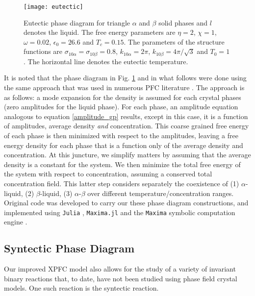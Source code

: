 \begin{figure}[h]
    \centering	
    \texttt{[image: eutectic]}
    \caption[Eutectic Phase Diagram]{
        \label{eutectic} Eutectic phase diagram for triangle $\alpha$ and
        $\beta$ solid phases and $l$ denotes the liquid. The free energy
        parameters are $\eta = 2$, $\chi = 1$, $\omega=0.02$, $\epsilon_0 =
        26.6$ and $T_c = 0.15$. The parameters of the structure functions are
        $\sigma_{10\alpha} = \sigma_{10\beta} = 0.8$, $k_{10\alpha} = 2\pi$,
        $k_{10\beta} = 4\pi/\sqrt{3}$ and $T_0 = 1$. The horizontal line
        denotes the eutectic temperature.
    }
\end{figure}

It is noted that the phase diagram in Fig. \ref{eutectic} and in what follows
were done using the same approach that was used in numerous PFC literature
\cite{GREENWOOD11_BINARY}. The approach is as follows: a mode expansion for the
density is assumed for each crystal phases (zero amplitudes for the liquid
phase). For each  phase, an amplitude equation analogous to equation
\ref{amplitude_gp} results, except in this case, it is a function of
amplitudes, average density {\it and} concentration. This coarse grained free
energy of each phase is then minimized with respect to the amplitudes, leaving
a free energy density for each phase that is a function only of the average
density and concentration. At this juncture, we simplify matters by assuming
that the average density is a constant for the system. We then minimize the
total free energy of the system with respect to concentration, assuming a
conserved total concentration field. This latter step considers separately the
coexistence of  (1) $\alpha$-liquid, (2)  $\beta$-liquid, (3) $\alpha$-$\beta$
over different temperature/concentration ranges. Original code was developed to
carry our these phase diagram constructions, and implemented using
\texttt{Julia} \cite{JULIA}, \texttt{Maxima.jl} \cite{MAXIMAJL} and the
\texttt{Maxima} symbolic computation engine \cite{MAXIMA}.  

\subsection{Syntectic Phase Diagram} %

Our improved XPFC model also allows for the study of a variety of invariant
binary reactions that, to date, have not been studied using phase field crystal
models. One such reaction is the syntectic reaction. 

